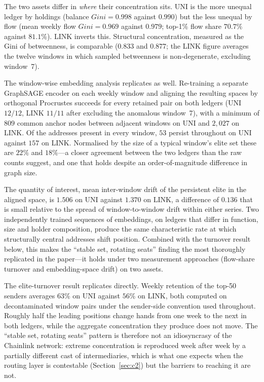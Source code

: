 \documentclass[final,5p,times]{elsarticle}
\begin{document}
The two assets differ in \emph{where} their concentration sits. UNI is the
more unequal ledger by holdings (balance $Gini = 0.998$ against $0.990$) but
the less unequal by flow (mean weekly flow $Gini = 0.969$ against $0.979$;
top-1\% flow share $70.7\%$ against $81.1\%$). LINK inverts this. Structural
concentration, measured as the Gini of betweenness, is comparable
($0.833$ and $0.877$; the LINK figure averages the twelve windows in which
sampled betweenness is non-degenerate, excluding window~7).

The window-wise embedding analysis replicates as well. Re-training a
separate GraphSAGE encoder on each weekly window and aligning the resulting
spaces by orthogonal Procrustes succeeds for every retained pair on both
ledgers (UNI $12/12$, LINK $11/11$ after excluding the anomalous window~7),
with a minimum of $809$ common anchor nodes between adjacent windows on UNI
and $2{,}027$ on LINK. Of the addresses present in every window, $53$
persist throughout on UNI against $157$ on LINK. Normalised by the size of a
typical window's elite set these are $22\%$ and $18\%$---a closer agreement
between the two ledgers than the raw counts suggest, and one that holds
despite an order-of-magnitude difference in graph size.

The quantity of interest, mean inter-window drift of the persistent elite in
the aligned space, is $1.506$ on UNI against $1.370$ on LINK, a difference
of $0.136$ that is small relative to the spread of window-to-window drift
within either series. Two independently trained sequences of embeddings, on ledgers that
differ in function, size and holder composition, produce the same
characteristic rate at which structurally central addresses shift position.
Combined with the turnover result below, this makes the ``stable set,
rotating seats'' finding the most thoroughly replicated in the paper---it
holds under two measurement approaches (flow-share turnover and
embedding-space drift) on two assets.

The elite-turnover result replicates directly. Weekly retention of the
top-50 senders averages $63\%$ on UNI against $56\%$ on LINK, both computed
on decontaminated window pairs under the sender-side convention used
throughout. Roughly half the leading positions change hands from
one week to the next in both ledgers, while the aggregate concentration
they produce does not move. The ``stable set, rotating seats'' pattern is
therefore not an idiosyncrasy of the Chainlink network: extreme
concentration is reproduced week after week by a partially different cast
of intermediaries, which is what one expects when the routing layer is
contestable (Section~\ref{sec:c2}) but the barriers to reaching it are not.
\end{document}
